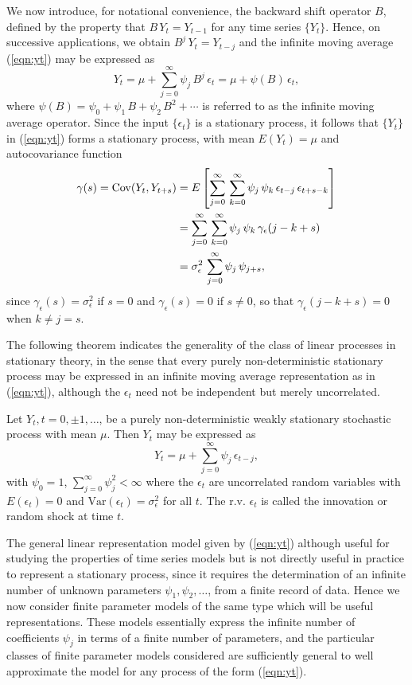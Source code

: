 We now introduce, for notational convenience, the backward shift operator $B$, defined by the property that $B\,Y_t = Y_{t-1}$ for any time series $\{Y_t\}$. Hence, on successive applications, we obtain $B^j \, Y_t = Y_{t-j}$ and the infinite moving average (\ref{eqn:yt}) may be expressed as
	\[
	Y_t = \mu + \sum_{j=0}^{\infty} \psi_j \,  B^j \, \epsilon_t = \mu + \psi(B) \, \epsilon_t,
	\]
where $\psi(B) = \psi_0 + \psi_1 \, B + \psi_2 \, B^2 + \cdots$ is referred to as the infinite moving average operator. Since the input $\{\epsilon_t\}$ is a stationary process, it follows that $\{Y_t\}$ in (\ref{eqn:yt}) forms a stationary process, with mean $E(Y_t)=\mu$ and autocovariance function
	\begin{equation}\label{eqn:covyt}
	\begin{split}
	\gamma(s)= \Cov(Y_t, Y_{t+s})&=E \left[ \sum_{j=0}^{\infty} \, \sum_{k=0}^{\infty} \psi_j \, \psi_k \, \epsilon_{t-j} \, \epsilon_{t+s-k} \right] \\
	&=\sum_{j=0}^{\infty} \, \sum_{k=0}^{\infty} \psi_j \, \psi_k \, \gamma_{\epsilon}(j-k+s) \\
	&=\sigma^2_{\epsilon} \, \sum_{j=0}^{\infty} \psi_j \, \psi_{j+s},
	\end{split}
	\end{equation}      
since $\gamma_{\epsilon}(s) = \sigma^2_{\epsilon}$ if $s=0$ and $\gamma_{\epsilon}(s) = 0$ if $s \neq 0$, so that $\gamma_{\epsilon}(j-k+s) = 0$ when $k \neq j=s$.
	

The following theorem indicates the generality of the class of linear processes in stationary theory, in the sense that every purely non-deterministic stationary process may be expressed in an infinite moving average representation as in (\ref{eqn:yt}), although the $\epsilon_t$ need not be independent but merely uncorrelated.	


\begin{thm} \label{thm:wold}
Let $Y_t, t=0, \pm 1, \ldots$, be a purely non-deterministic weakly stationary stochastic process with mean $\mu$. Then $Y_t$ may be expressed as
	\[
	Y_t = \mu + \sum_{j=0}^{\infty} \psi_j \, \epsilon_{t-j},
	\]
with  $\psi_0 = 1$, $\sum_{j=0}^{\infty} \psi_j^2 < \infty$ where the $\epsilon_t$ are uncorrelated random variables with $E(\epsilon_t)=0$ and $\text{Var}(\epsilon_t)=\sigma^2_{\epsilon}$ for all $t$. The r.v. $\epsilon_t$ is called the innovation or random shock at time $t$.
\end{thm}


The general linear representation model given by (\ref{eqn:yt}) although useful for studying the properties of time series models but is not directly useful in practice to represent a stationary process, since it requires the determination of an infinite number of unknown parameters $\psi_1,\psi_2, \ldots$, from a finite record of data. Hence we now consider finite parameter models of the same type which will be useful representations. These models essentially express the infinite number of coefficients $\psi_j$ in terms of a finite number of parameters, and the particular classes of finite parameter models considered are sufficiently general to well approximate the model for any process of the form (\ref{eqn:yt}). \\


